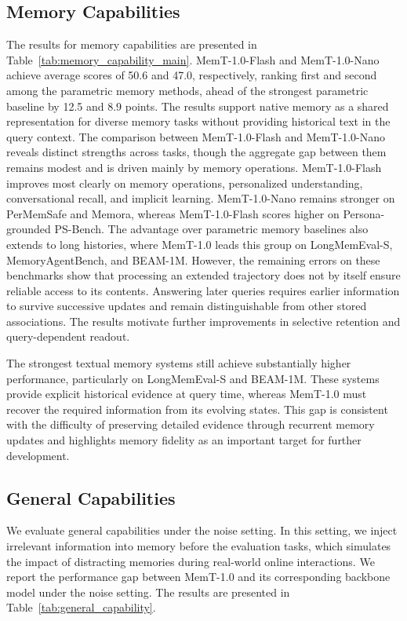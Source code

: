 \subsection{Memory Capabilities}
The results for memory capabilities are presented in Table~\ref{tab:memory_capability_main}.
MemT-1.0-Flash and MemT-1.0-Nano achieve average scores of 50.6 and 47.0, respectively, ranking first and second among the parametric memory methods, ahead of the strongest parametric baseline by 12.5 and 8.9 points.
The results support native memory as a shared representation for diverse memory tasks without providing historical text in the query context.
The comparison between MemT-1.0-Flash and MemT-1.0-Nano reveals distinct strengths across tasks, though the aggregate gap between them remains modest and is driven mainly by memory operations.
MemT-1.0-Flash improves most clearly on memory operations, personalized understanding, conversational recall, and implicit learning.
MemT-1.0-Nano remains stronger on PerMemSafe and Memora, whereas MemT-1.0-Flash scores higher on Persona-grounded PS-Bench.
The advantage over parametric memory baselines also extends to long histories, where MemT-1.0 leads this group on LongMemEval-S, MemoryAgentBench, and BEAM-1M.
However, the remaining errors on these benchmarks show that processing an extended trajectory does not by itself ensure reliable access to its contents.
Answering later queries requires earlier information to survive successive updates and remain distinguishable from other stored associations.
The results motivate further improvements in selective retention and query-dependent readout.

The strongest textual memory systems still achieve substantially higher performance, particularly on LongMemEval-S and BEAM-1M.
These systems provide explicit historical evidence at query time, whereas MemT-1.0 must recover the required information from its evolving states.
This gap is consistent with the difficulty of preserving detailed evidence through recurrent memory updates and highlights memory fidelity as an important target for further development.

\subsection{General Capabilities}
We evaluate general capabilities under the noise setting.
In this setting, we inject irrelevant information into memory before the evaluation tasks, which simulates the impact of distracting memories during real-world online interactions.
We report the performance gap between MemT-1.0 and its corresponding backbone model under the noise setting.
The results are presented in Table~\ref{tab:general_capability}.


